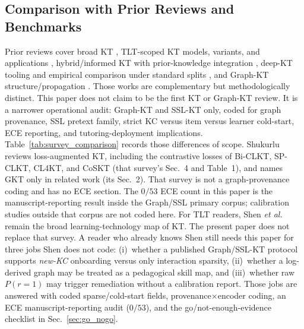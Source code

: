 \documentclass[lettersize,journal]{IEEEtran}
\begin{document}
\subsection{Comparison with Prior Reviews and Benchmarks}
Prior reviews cover broad KT \cite{Abdelrahman_Survey_2023}, TLT-scoped KT models, variants, and applications \cite{Shen_KTSurvey_2024}, hybrid/informed KT with prior-knowledge integration \cite{Zanellati_HybridKT_2024}, deep-KT tooling and empirical comparison under standard splits \cite{Liu_pyKT_2022,Liu_DLKT_2025}, and Graph-KT structure/propagation \cite{Xu_GbKT_2026}. Those works are complementary but methodologically distinct. This paper does not claim to be the first KT or Graph-KT review. It is a narrower operational audit: Graph-KT and SSL-KT only, coded for graph provenance, SSL pretext family, strict KC versus item versus learner cold-start, ECE reporting, and tutoring-deployment implications. Table~\ref{tab:survey_comparison} records those differences of scope. Shukurlu \cite{Shukurlu_LossKT_2025} reviews loss-augmented KT, including the contrastive losses of Bi-CLKT, SP-CLKT, CL4KT, and CoSKT (that survey's Sec.~4 and Table~1), and names GKT only in related work (its Sec.~2). That survey is not a graph-provenance coding and has no ECE section. The $0/53$ ECE count in this paper is the manuscript-reporting result inside the Graph/SSL primary corpus; calibration studies outside that corpus are not coded here.
For TLT readers, Shen \textit{et al.} remain the broad learning-technology map of KT. The present paper does not replace that survey. A reader who already knows Shen still needs this paper for three jobs Shen does not code: (i)~whether a published Graph/SSL-KT protocol supports \emph{new-KC} onboarding versus only interaction sparsity, (ii)~whether a log-derived graph may be treated as a pedagogical skill map, and (iii)~whether raw $P(r=1)$ may trigger remediation without a calibration report. Those jobs are answered with coded sparse/cold-start fields, provenance$\times$encoder coding, an ECE manuscript-reporting audit ($0/53$), and the go/not-enough-evidence checklist in Sec.~\ref{sec:go_nogo}.
\end{document}
